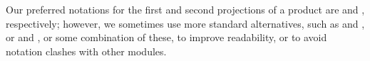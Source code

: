 \newcommand\FstUnder{\AgdaOperator{\AgdaFunction{∣\AgdaUnderscore{}∣}}\xspace}
\newcommand\SndUnder{\AgdaOperator{\AgdaFunction{∥\AgdaUnderscore{}∥}}\xspace}
Our preferred notations for the first and second projections of a product are \FstUnder and \SndUnder, respectively; however, we sometimes use more standard alternatives, such as  and , or  and , or some combination of these, to improve readability, or to avoid notation clashes with other modules.
\ccpad
\begin{code}%
\>[0]\AgdaSpace{}%
\AgdaModule{\AgdaUnderscore{}}\AgdaSpace{}%
\AgdaSymbol{\{}\AgdaSpace{}%
\AgdaSymbol{:}\AgdaSpace{}%
\AgdaSymbol{\}}\AgdaSpace{}%
\<%
\\
\>[0][@{}l@{\AgdaIndent{0}}]%
\>[1]\AgdaSpace{}%
\AgdaSpace{}%
\AgdaSymbol{:}\AgdaSpace{}%
\AgdaSymbol{\{}\AgdaSpace{}%
\AgdaSymbol{:}\AgdaSpace{}%
\AgdaSpace{}%
\AgdaSpace{}%
\AgdaSymbol{\}\{}\AgdaSpace{}%
\AgdaSymbol{:}\AgdaSpace{}%
\AgdaSpace{}%
\AgdaSpace{}%
\AgdaSpace{}%
\AgdaSymbol{\}}\AgdaSpace{}%
\AgdaSpace{}%
\AgdaSpace{}%
\AgdaSpace{}%
\AgdaSpace{}%
\<%
\\
%
\>[1]\AgdaSpace{}%
\AgdaSpace{}%
\AgdaOperator{\AgdaInductiveConstructor{,}}\AgdaSpace{}%
\AgdaSpace{}%
\AgdaSpace{}%
\AgdaSymbol{=}\AgdaSpace{}%
\<%
\\
%
\>[1]\AgdaSpace{}%
\AgdaSymbol{(}\AgdaSpace{}%
\AgdaOperator{\AgdaInductiveConstructor{,}}\AgdaSpace{}%
\AgdaSymbol{)}\AgdaSpace{}%
\AgdaSymbol{=}\AgdaSpace{}%
\<%
\\
%
\>[1]\AgdaSpace{}%
\AgdaSpace{}%
\AgdaSymbol{:}\AgdaSpace{}%
\AgdaSymbol{\{}\AgdaSpace{}%
\AgdaSymbol{:}\AgdaSpace{}%
\AgdaSpace{}%
\AgdaSpace{}%
\AgdaSymbol{\}\{}\AgdaSpace{}%
\AgdaSymbol{:}\AgdaSpace{}%
\AgdaSpace{}%
\AgdaSpace{}%
\AgdaSpace{}%
\AgdaSpace{}%
\AgdaSymbol{\}}\AgdaSpace{}%

\end{code}
